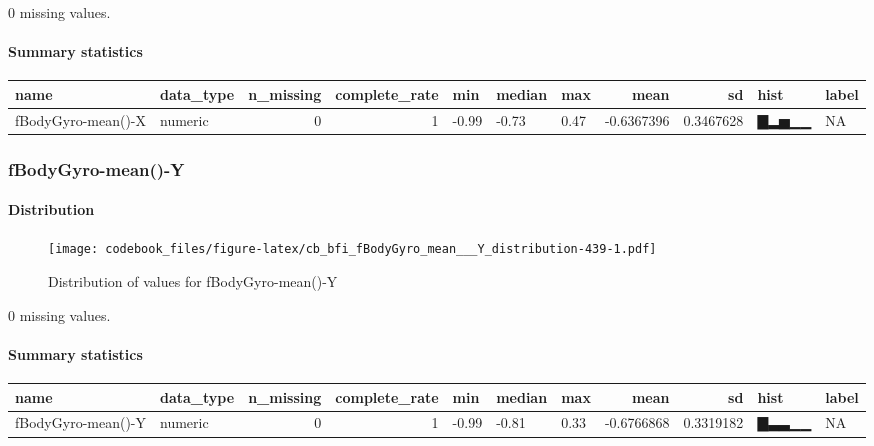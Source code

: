 \documentclass[
]{article}
\begin{document}
0 missing values.

\hypertarget{fBodyGyro_mean___X_summary}{%
\paragraph{Summary statistics}\label{fBodyGyro_mean___X_summary}}

\begin{longtable}[]{@{}llrrlllrrll@{}}
\toprule
name & data\_type & n\_missing & complete\_rate & min & median & max &
mean & sd & hist & label \\
\midrule
\endhead
fBodyGyro-mean()-X & numeric & 0 & 1 & -0.99 & -0.73 & 0.47 & -0.6367396
& 0.3467628 & ▇▂▅▁▁ & NA \\
\bottomrule
\end{longtable}

\hypertarget{fBodyGyro_mean___Y}{%
\subsubsection{fBodyGyro-mean()-Y}\label{fBodyGyro_mean___Y}}

\hypertarget{fBodyGyro_mean___Y_distribution}{%
\paragraph{Distribution}\label{fBodyGyro_mean___Y_distribution}}

\begin{figure}
\centering
\texttt{[image: codebook\_files/figure-latex/cb\_bfi\_fBodyGyro\_mean\_\_\_Y\_distribution-439-1.pdf]}
\caption{Distribution of values for fBodyGyro-mean()-Y}
\end{figure}

0 missing values.

\hypertarget{fBodyGyro_mean___Y_summary}{%
\paragraph{Summary statistics}\label{fBodyGyro_mean___Y_summary}}

\begin{longtable}[]{@{}llrrlllrrll@{}}
\toprule
name & data\_type & n\_missing & complete\_rate & min & median & max &
mean & sd & hist & label \\
\midrule
\endhead
fBodyGyro-mean()-Y & numeric & 0 & 1 & -0.99 & -0.81 & 0.33 & -0.6766868
& 0.3319182 & ▇▃▃▁▁ & NA \\
\bottomrule
\end{longtable}
\end{document}
